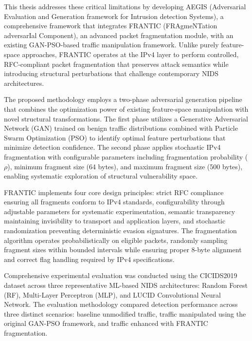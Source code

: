 This thesis addresses these critical limitations by developing AEGIS (Adversarial Evaluation and Generation framework for Intrusion detection Systems), a comprehensive framework that integrates FRANTIC (FRAgmeNTation adversarIal Component), an advanced packet fragmentation module, with an existing GAN-PSO-based traffic manipulation framework. Unlike purely feature-space approaches, FRANTIC operates at the IPv4 layer to perform controlled, RFC-compliant packet fragmentation that preserves attack semantics while introducing structural perturbations that challenge contemporary NIDS architectures.

The proposed methodology employs a two-phase adversarial generation pipeline that combines the optimization power of existing feature-space manipulation with novel structural transformations. The first phase utilizes a Generative Adversarial Network (GAN) trained on benign traffic distributions combined with Particle Swarm Optimization (PSO) to identify optimal feature perturbations that minimize detection confidence. The second phase applies stochastic IPv4 fragmentation with configurable parameters including fragmentation probability ($\rho$), minimum fragment size (64 bytes), and maximum fragment size (500 bytes), enabling systematic exploration of structural vulnerability space.

FRANTIC implements four core design principles: strict RFC compliance ensuring all fragments conform to IPv4 standards, configurability through adjustable parameters for systematic experimentation, semantic transparency maintaining invisibility to transport and application layers, and stochastic randomization preventing deterministic evasion signatures. The fragmentation algorithm operates probabilistically on eligible packets, randomly sampling fragment sizes within bounded intervals while ensuring proper 8-byte alignment and correct flag handling required by IPv4 specifications.

Comprehensive experimental evaluation was conducted using the CICIDS2019 dataset across three representative ML-based NIDS architectures: Random Forest (RF), Multi-Layer Perceptron (MLP), and LUCID Convolutional Neural Network. The evaluation methodology compared detection performance across three distinct scenarios: baseline unmodified traffic, traffic manipulated using the original GAN-PSO framework, and traffic enhanced with FRANTIC fragmentation.

